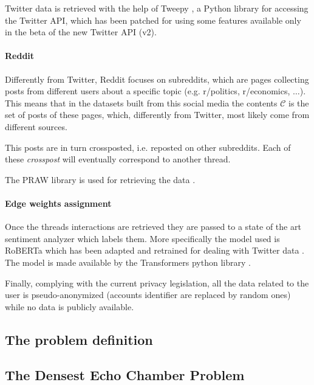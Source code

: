 Twitter data is retrieved with the help of Tweepy \cite{tweepy}, a Python
library for accessing the Twitter API, which has been patched for using some
features available only in the beta of the new Twitter API (v2).

\paragraph{Reddit}%
\label{par:reddit}

Differently from Twitter, Reddit focuses on subreddits, which are pages
collecting posts from different users about a specific topic (e.g. r/politics,
r/economics, $\dots$). This means that
in the datasets built from this social media the contents $\mathcal{C} $ is the
set of posts of these pages, which, differently from Twitter, most likely
come from different sources.

This posts are in turn crossposted, i.e. reposted on other subreddits. Each of
these \emph{crosspost} will eventually correspond to another thread.

The PRAW library is used for retrieving the data \cite{praw}.

\paragraph{Edge weights assignment}%
\label{par:assigning_edge_weights}

Once the threads interactions are retrieved they are passed to a state of the
art sentiment analyzer which labels them. More specifically the model used is
RoBERTa which has been adapted and retrained for dealing with Twitter
data \cite{Barbieri2020}. The model is made available by the Transformers
python library \cite{wolf-etal-2020-transformers}.

\bigskip

Finally, complying with the current privacy legislation, all the data related
to the user is pseudo-anonymized (accounts identifier are replaced by random
ones) while no data is publicly available.

\subsection{The problem definition}%
\label{sub:the_problem_definition}

\subsection{The Densest Echo Chamber Problem}%
\label{sub:the_densest_echo_chamber_problem}


